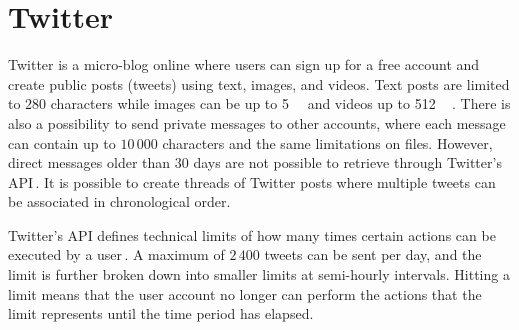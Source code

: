 \section{Twitter}
Twitter is a micro-blog online where users can sign up for a free account and create public posts (tweets) using text, images, and videos. Text posts are limited to $280$ characters while images can be up to \SI{5}{\mega\byte} and videos up to \SI{512}{\mega\byte}\,\cite{MediaBestPractices}. There is also a possibility to send private messages to other accounts, where each message can contain up to $10\,000$ characters and the same limitations on files. However, direct messages older than $30$ days are not possible to retrieve through Twitter's API\,\cite{RetrievingOlder302018}. It is possible to create threads of Twitter posts where multiple tweets can be associated in chronological order.

Twitter's API defines technical limits of how many times certain actions can be executed by a user\,\cite{UnderstandingTwitterLimits}. A maximum of $2\,400$ tweets can be sent per day, and the limit is further broken down into smaller limits at semi-hourly intervals. Hitting a limit means that the user account no longer can perform the actions that the limit represents until the time period has elapsed.